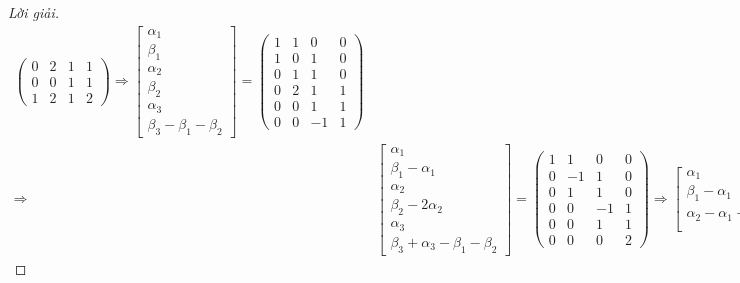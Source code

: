 \documentclass[class=linearalgebra,crop=false]{standalone}
\begin{document}
\begin{proof}[Lời giải]
\begin{align*}
\begin{pmatrix}
            0 & 2 & 1 & 1 \\
            0 & 0 & 1 & 1 \\
            1 & 2 & 1 & 2
        \end{pmatrix}
        \Longrightarrow
        \begin{bmatrix}
            \alpha_{1} \\
            \beta_{1} \\
            \alpha_{2} \\
            \beta_{2} \\
            \alpha_{3} \\
            \beta_{3} - \beta_{1} - \beta_{2}
        \end{bmatrix}=
        \begin{pmatrix}
            1 & 1 & 0 & 0 \\
            1 & 0 & 1 & 0 \\
            0 & 1 & 1 & 0 \\
            0 & 2 & 1 & 1 \\
            0 & 0 & 1 & 1 \\
            0 & 0 & -1 & 1
        \end{pmatrix} \\
        \Longrightarrow&
        \begin{bmatrix}
            \alpha_{1} \\
            \beta_{1} - \alpha_{1} \\
            \alpha_{2} \\
            \beta_{2} - 2\alpha_{2} \\
            \alpha_{3} \\
            \beta_{3} + \alpha_{3} - \beta_{1} - \beta_{2}
        \end{bmatrix}=
        \begin{pmatrix}
            1 & 1 & 0 & 0 \\
            0 & -1 & 1 & 0 \\
            0 & 1 & 1 & 0 \\
            0 & 0 & -1 & 1 \\
            0 & 0 & 1 & 1 \\
            0 & 0 & 0 & 2
        \end{pmatrix}
        \Longrightarrow
        \begin{bmatrix}
            \alpha_{1} \\
            \beta_{1} - \alpha_{1} \\
            \alpha_{2} - \alpha_{1} + \beta_{1} \\

\end{bmatrix}
\end{align*}
\end{proof}
\end{document}
